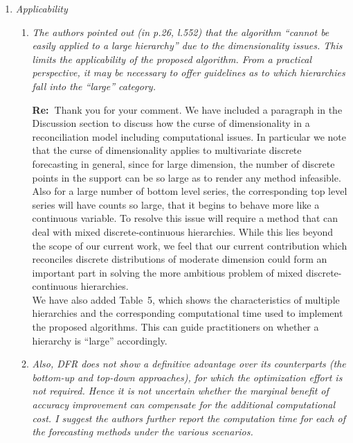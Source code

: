 \documentclass[11pt,a4paper]{article}
\newcommand{\RE}[2][Re:~]{{\color{blue}\textbf{#1}#2}}
\begin{document}
\begin{enumerate}%
\item \textit{Applicability}

  \begin{enumerate}
    \item \textit{The authors pointed out (in p.26, l.552) that the algorithm ``cannot be easily applied to a large hierarchy'' due to the dimensionality issues. This limits the applicability of the proposed algorithm. From a practical perspective, it may be necessary to offer guidelines as to which hierarchies fall into the ``large'' category. }

    \RE{Thank you for your comment. We have included a paragraph in the Discussion section to discuss how the curse of dimensionality in a reconciliation model including computational issues. In particular we note that the curse of dimensionality applies to multivariate discrete forecasting in general, since for large dimension, the number of discrete points in the support can be so large as to render any method infeasible. Also for a large number of bottom level series, the corresponding top level series will have counts so large, that it begins to behave more like a continuous variable. To resolve this issue will require a method that can deal with mixed discrete-continuous hierarchies. While this lies beyond the scope of our current work, we feel that our current contribution which reconciles discrete distributions of moderate dimension could form an important part in solving the more ambitious problem of mixed discrete-continuous hierarchies.\\  
    	
    	
    	We have also added Table~5, which shows the characteristics of multiple hierarchies and the corresponding computational time used to implement the proposed algorithms. This can guide practitioners on whether a hierarchy is ``large'' accordingly.\\
   }
    


    \item \textit{Also, DFR does not show a definitive advantage over its counterparts (the bottom-up and top-down approaches), for which the optimization effort is not required. Hence it is not uncertain whether the marginal benefit of accuracy improvement can compensate for the additional computational cost. I suggest the authors further report the computation time for each of the forecasting methods under the various scenarios.}


\end{enumerate}
\end{enumerate}
\end{document}
